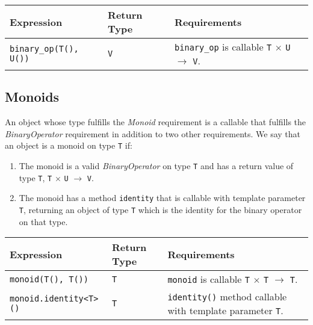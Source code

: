 \begin{tabularx}{\textwidth}{l l X}
\textbf{Expression} & \textbf{Return Type} & \textbf{Requirements}\\
\hline
\texttt{binary\_op(T(), U())} & \texttt{V} & \texttt{binary\_op} is callable \texttt{T} $\times$ \texttt{U} $\rightarrow$ \texttt{V}.\\
\end{tabularx}

\subsection{Monoids}
An object whose type fulfills the \textit{Monoid} requirement is a callable that
fulfills the \textit{BinaryOperator} requirement in addition to two other requirements.
We say that an object is a monoid on type \texttt{T} if:

\begin{enumerate}
   \item The monoid is a valid \textit{BinaryOperator} on type \texttt{T} and has a return value of type \texttt{T}, \texttt{T} $\times$ \texttt{U} $\rightarrow$ \texttt{V}.
   \item The monoid has a method \texttt{identity} that is callable with template parameter \texttt{T}, returning an object of type \texttt{T} which is the identity for the binary operator on that type.
\end{enumerate}

\begin{tabularx}{\textwidth}{l l X}
\textbf{Expression} & \textbf{Return Type} & \textbf{Requirements}\\
\hline
\texttt{monoid(T(), T())} & \texttt{T} & \texttt{monoid} is callable \texttt{T} $\times$ \texttt{T} $\rightarrow$ \texttt{T}.\\
\hline
\texttt{monoid.identity<T>()} & \texttt{T} & \texttt{identity()} method callable with template parameter \texttt{T}.\\
\end{tabularx}

